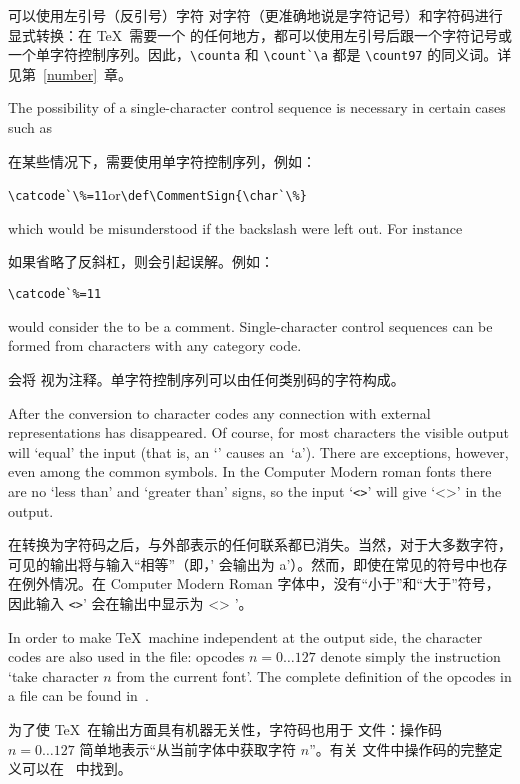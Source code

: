 可以使用左引号（反引号）字符 \n{{}} 对字符（更准确地说是字符记号）和字符码进行显式转换：在 \TeX\ 需要一个  的任何地方，都可以使用左引号后跟一个字符记号或一个单字符控制序列。因此，\verb.\counta. 和 \verb.\count`\a. 都是 \verb.\count97. 的同义词。详见第~\ref{number}~章。


The possibility of a single-character control
sequence is necessary in certain cases such as

在某些情况下，需要使用单字符控制序列，例如：
\begin{disp}\verb>\catcode`\%=11>\quad or\quad \verb>\def\CommentSign{\char`\%}>\end{disp}
which would be misunderstood if the backslash were left out.
For instance 

如果省略了反斜杠，则会引起误解。例如：
\begin{verbatim}
\catcode`%=11
\end{verbatim}
would consider
the  to be a comment.
Single-character
control sequences can be formed from characters with any
category code.

会将  视为注释。单字符控制序列可以由任何类别码的字符构成。

After the conversion to character codes any connection
with external representations has disappeared. Of course,
for most characters  the visible output will `equal' the input
(that is, an `' causes an~`a').
There are exceptions, however, even among the common symbols.
In the Computer Modern
roman fonts there are no `less than' and `greater than'
%
signs, so the input `\verb.<>.' will give `<>' in the output.

在转换为字符码之后，与外部表示的任何联系都已消失。当然，对于大多数字符，可见的输出将与输入“相等”（即，' 会输出为 a'）。然而，即使在常见的符号中也存在例外情况。在 Computer Modern Roman 字体中，没有“小于”和“大于”符号，因此输入 \verb.<>.' 会在输出中显示为 <> '。

In order to make \TeX\ machine independent at the output
side, the character codes are also used in the  file:
opcodes $n=0\ldots127$ denote simply the instruction `take
character $n$ from the current font'. The complete definition
of the opcodes in a  file can be found in~\cite{Knuth:TeXprogram}.

为了使 \TeX\ 在输出方面具有机器无关性，字符码也用于  文件：操作码 $n=0\ldots127$ 简单地表示“从当前字体中获取字符 $n$”。有关  文件中操作码的完整定义可以在~\cite{Knuth:TeXprogram} 中找到。


